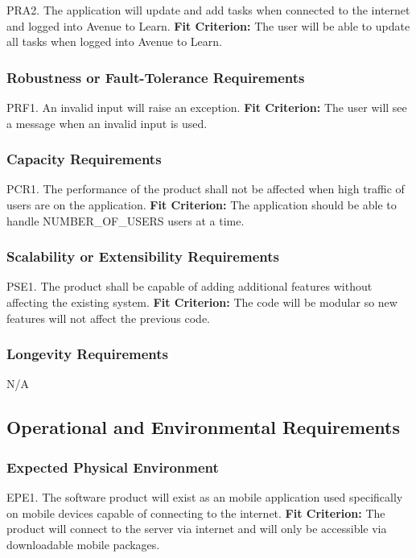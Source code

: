 \documentclass[12pt, titlepage]{article}
\begin{document}
\noindent PRA2. The application will update and add tasks when connected to the internet and logged into Avenue to Learn.
	\textbf{Fit Criterion:} The user will be able to update all tasks when logged into Avenue to 
Learn.

\subsubsection{Robustness or Fault-Tolerance Requirements}

PRF1. An invalid input will raise an exception.
	\textbf{Fit Criterion:} The user will see a message when an invalid input is used.

\subsubsection{Capacity Requirements}

PCR1. The performance of the product shall not be affected when high traffic of users are on the application.
	\textbf{Fit Criterion:} The application should be able to handle NUMBER\_OF\_USERS users at 
a time.

\subsubsection{Scalability or Extensibility Requirements}

PSE1. The product shall be capable of adding additional features without affecting the existing system.
	\textbf{Fit Criterion:} The code will be modular so new features will not affect the previous 
code.

\subsubsection{Longevity Requirements}

N/A

\subsection{Operational and Environmental Requirements}

\subsubsection{Expected Physical Environment}

EPE1. The software product will exist as an mobile application used specifically on mobile devices capable of connecting to the internet. 
	\textbf{Fit Criterion:} The product will connect to the server via internet and will only be accessible via downloadable mobile packages.
\end{document}
